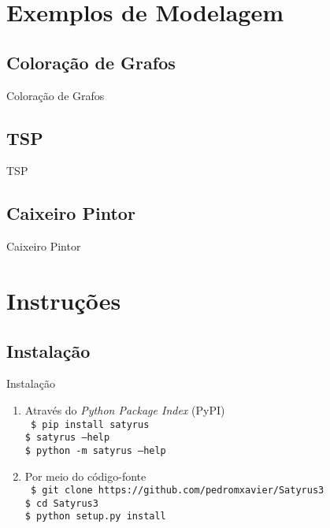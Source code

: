 \documentclass[brazil, MathSerif, aspectratio = 169]{beamer}
\begin{document}
\section{Exemplos de Modelagem}
\SectionPage

\subsection{Coloração de Grafos}
\begin{frame}{Coloração de Grafos}

\end{frame}

\subsection{TSP}
\begin{frame}{TSP}

\end{frame}

\subsection{Caixeiro Pintor}
\begin{frame}{Caixeiro Pintor}

\end{frame}

\section{Instruções}

\subsection{Instalação}
\begin{frame}%
    {Instalação}

    \begin{enumerate}
        \item Através do \textit{Python Package Index} (PyPI)\\%
              \texttt{%
                  \$ pip install satyrus\\%
                  \$ satyrus --help\\%
                  \$ python -m satyrus --help
              }
        \item Por meio do código-fonte\\%
              \texttt{%
                  \$ git clone https://github.com/pedromxavier/Satyrus3\\%
                  \$ cd Satyrus3\\%
                  \$ python setup.py install
              }
    \end{enumerate}
\end{frame}
\end{document}
